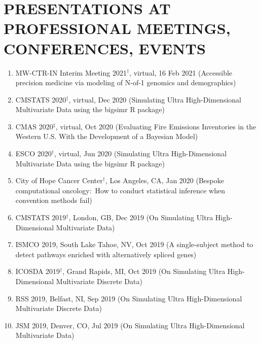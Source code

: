 \documentclass[paper=a4,fontsize=11pt]{scrartcl} %
\newcommand{\NewPart}[2]{\section*{\uppercase{#1} #2 }}
\newcommand{\TalkEntry}[4]{
		\noindent #1, #2, #3 #4}
\begin{document}

\NewPart{Presentations at professional meetings, conferences, events}{}
\vspace{-7pt}
\begin{enumerate}

\item \TalkEntry{MW-CTR-IN Interim Meeting 2021$^{\dagger}$}{virtual}{16 Feb 2021}{(Accessible precision medicine via modeling of N-of-1 genomics and demographics)}
  
\item \TalkEntry{CMSTATS 2020$^{\dagger}$}{virtual}{Dec 2020}{(Simulating Ultra High-Dimensional Multivariate Data using the bigsimr R package)}

\item \TalkEntry{CMAS 2020$^{\ddag}$}{virtual}{Oct 2020}{(Evaluating Fire Emissions Inventories in the Western U.S. With the Development of a Bayesian Model)}
  
\item \TalkEntry{ESCO 2020$^{\dagger}$}{virtual}{Jun 2020}{(Simulating Ultra High-Dimensional Multivariate Data using the bigsimr R package)}
  
\item \TalkEntry{City of Hope Cancer Center$^{\dagger}$}{Los Angeles, CA}{Jan 2020}{(Bespoke computational oncology:~How to conduct statistical inference when convention methods fail)}
  
\item \TalkEntry{CMSTATS 2019$^{\dagger}$}{London, GB}{Dec 2019}{(On Simulating Ultra High-Dimensional Multivariate Data)}

\item \TalkEntry{ISMCO 2019}{South Lake Tahoe, NV}{Oct 2019}{(A single-subject method to detect pathways enriched with alternatively spliced genes)}
  
\item \TalkEntry{ICOSDA 2019$^{\dagger}$}{Grand Rapids, MI}{Oct 2019}{(On Simulating Ultra High-Dimensional Multivariate Discrete Data)}
  
\item \TalkEntry{RSS 2019}{Belfast, NI}{Sep 2019}{(On Simulating Ultra High-Dimensional Multivariate Discrete Data)}
  
\item \TalkEntry{JSM 2019}{Denver, CO}{Jul 2019}{(On Simulating Ultra High-Dimensional Multivariate Data)}
  

\end{enumerate}
\end{document}

